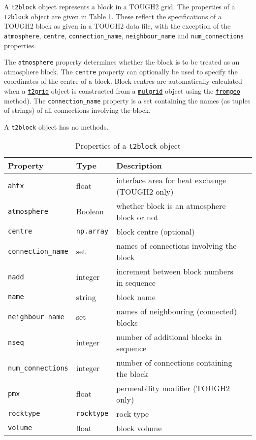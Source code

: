 A \texttt{t2block} object represents a block in a TOUGH2 grid.  The properties of a \texttt{t2block} object are given in Table \ref{tb:t2block_properties}.  These reflect the specifications of a TOUGH2 block as given in a TOUGH2 data file, with the exception of the \texttt{atmosphere}, \texttt{centre}, \texttt{connection\_name}, \texttt{neighbour\_name} and \texttt{num\_connections} properties.

The \texttt{atmosphere} property determines whether the block is to be treated as an atmosphere block.  The \texttt{centre} property can optionally be used to specify the coordinates of the centre of a block.  Block centres are automatically calculated when a \hyperref[t2grids]{\texttt{t2grid}} object is constructed from a \hyperref[mulgrids]{\texttt{mulgrid}} object using the \hyperref[sec:t2grid:fromgeo]{\texttt{fromgeo}} method).  The \texttt{connection\_name} property is a set containing the names (as tuples of strings) of all connections involving the block.

A \texttt{t2block} object has no methods.

\begin{table}
  \begin{center}
    \begin{tabular}{|l|l|l|l|}
      \hline
      \textbf{Property} & \textbf{Type} & \textbf{Description}\\
      \hline
      \texttt{ahtx} & float & interface area for heat exchange (TOUGH2 only)\\
      \texttt{atmosphere} & Boolean & whether block is an atmosphere block or not\\
      \texttt{centre} & \texttt{np.array} & block centre (optional)\\
      \texttt{connection\_name} & set & names of connections involving the block\\
      \texttt{nadd} & integer & increment between block numbers in sequence\\
      \texttt{name} & string & block name\\
      \texttt{neighbour\_name} & set & names of neighbouring (connected) blocks\\
      \texttt{nseq} & integer & number of additional blocks in sequence\\
      \texttt{num\_connections} & integer & number of connections containing the block\\
      \texttt{pmx} & float & permeability modifier (TOUGH2 only)\\
      \texttt{rocktype} & \texttt{rocktype} & rock type\\
      \texttt{volume} & float & block volume\\
      \hline
    \end{tabular}
    \caption{Properties of a \texttt{t2block} object}
    \label{tb:t2block_properties}
  \end{center}
\end{table}

